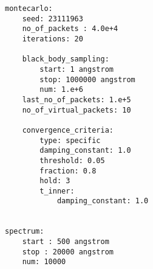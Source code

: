 \documentclass[letterpaper,12pt]{article}
\begin{document}
\begin{appendices}
\begin{lstlisting}
montecarlo:
    seed: 23111963
    no_of_packets : 4.0e+4
    iterations: 20
    
    black_body_sampling:
        start: 1 angstrom
        stop: 1000000 angstrom
        num: 1.e+6
    last_no_of_packets: 1.e+5
    no_of_virtual_packets: 10

    convergence_criteria:
        type: specific
        damping_constant: 1.0
        threshold: 0.05
        fraction: 0.8
        hold: 3
        t_inner:
            damping_constant: 1.0
    

spectrum:
    start : 500 angstrom
    stop : 20000 angstrom
    num: 10000                                                                               
\end{lstlisting}
\end{appendices}



\end{document}
